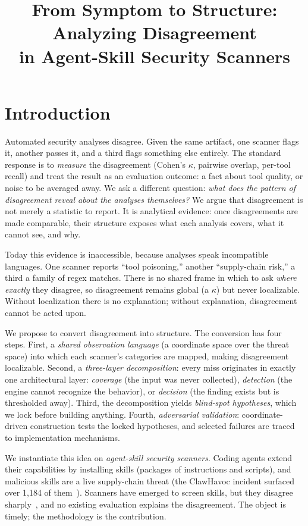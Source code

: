 \documentclass[sigconf,nonacm]{acmart}
\title{From Symptom to Structure: Analyzing Disagreement\\in Agent-Skill Security Scanners}
\begin{document}
\maketitle

\section{Introduction}
\label{sec:intro}

Automated security analyses disagree.
Given the same artifact, one scanner flags it, another passes it, and a third flags something else entirely.
The standard response is to \emph{measure} the disagreement (Cohen's $\kappa$, pairwise overlap, per-tool recall) and treat the result as an evaluation outcome: a fact about tool quality, or noise to be averaged away.
We ask a different question: \emph{what does the pattern of disagreement reveal about the analyses themselves?}
We argue that disagreement is not merely a statistic to report.
It is analytical evidence: once disagreements are made comparable, their structure exposes what each analysis covers, what it cannot see, and why.

Today this evidence is inaccessible, because analyses speak incompatible languages.
One scanner reports ``tool poisoning,'' another ``supply-chain risk,'' a third a family of regex matches.
There is no shared frame in which to ask \emph{where exactly} they disagree, so disagreement remains global (a $\kappa$) but never localizable.
Without localization there is no explanation; without explanation, disagreement cannot be acted upon.

We propose to convert disagreement into structure.
The conversion has four steps.
First, a \emph{shared observation language} (a coordinate space over the threat space) into which each scanner's categories are mapped, making disagreement localizable.
Second, a \emph{three-layer decomposition}: every miss originates in exactly one architectural layer: \emph{coverage} (the input was never collected), \emph{detection} (the engine cannot recognize the behavior), or \emph{decision} (the finding exists but is thresholded away).
Third, the decomposition yields \emph{blind-spot hypotheses}, which we lock before building anything.
Fourth, \emph{adversarial validation}: coordinate-driven construction tests the locked hypotheses, and selected failures are traced to implementation mechanisms.

We instantiate this idea on \emph{agent-skill security scanners}.
Coding agents extend their capabilities by installing skills (packages of instructions and scripts), and malicious skills are a live supply-chain threat (the ClawHavoc incident surfaced over 1{,}184 of them~\cite{clawhub2026}).
Scanners have emerged to screen skills, but they disagree sharply~\cite{clawhub2026,locatejudge2026}, and no existing evaluation explains the disagreement.
The object is timely; the methodology is the contribution.
\end{document}
